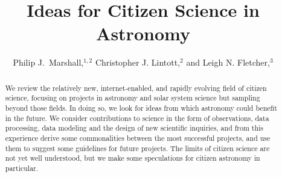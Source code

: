\documentclass{ar2e}
\begin{document}

\jvol{}
\ARinfo{}

\title{Ideas for Citizen Science in Astronomy}

\author{Philip J.\ Marshall,$^{1,2}$
Christopher J. Lintott,$^{2}$ and
Leigh N. Fletcher,$^{3}$
}




\begin{abstract} 

We review the relatively new, internet-enabled, and rapidly evolving field of
citizen science, focusing on projects in astronomy and solar system science but
sampling beyond those fields. In doing so, we look for  ideas from which
astronomy  could benefit in the future. We consider contributions to science in
the form of observations, data processing, data modeling and the design of new
scientific inquiries, and from this experience derive some commonalities between
the most successful projects, and use them to suggest some guidelines for future
projects. The limits of citizen science are not yet well understood, but we make
some speculations for citizen astronomy in particular.


\end{abstract}

\maketitle
\end{document}
